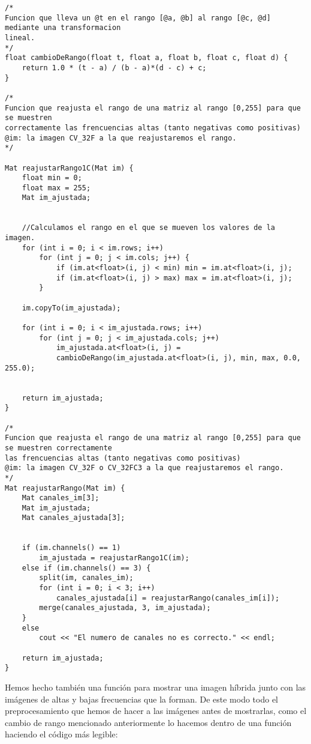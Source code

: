 \documentclass[10pt,a4paper]{article}
\begin{document}
\begin{lstlisting}
/*
Funcion que lleva un @t en el rango [@a, @b] al rango [@c, @d] mediante una transformacion
lineal.
*/
float cambioDeRango(float t, float a, float b, float c, float d) {
	return 1.0 * (t - a) / (b - a)*(d - c) + c;	
}

/*
Funcion que reajusta el rango de una matriz al rango [0,255] para que se muestren
correctamente las frencuencias altas (tanto negativas como positivas)
@im: la imagen CV_32F a la que reajustaremos el rango.
*/

Mat reajustarRango1C(Mat im) {
	float min = 0;
	float max = 255;
	Mat im_ajustada;


	//Calculamos el rango en el que se mueven los valores de la imagen.
	for (int i = 0; i < im.rows; i++)
		for (int j = 0; j < im.cols; j++) {
			if (im.at<float>(i, j) < min) min = im.at<float>(i, j);
			if (im.at<float>(i, j) > max) max = im.at<float>(i, j);
		}

	im.copyTo(im_ajustada);

	for (int i = 0; i < im_ajustada.rows; i++)
		for (int j = 0; j < im_ajustada.cols; j++)
			im_ajustada.at<float>(i, j) =
			cambioDeRango(im_ajustada.at<float>(i, j), min, max, 0.0, 255.0);


	return im_ajustada;
}

/*
Funcion que reajusta el rango de una matriz al rango [0,255] para que se muestren correctamente
las frencuencias altas (tanto negativas como positivas)
@im: la imagen CV_32F o CV_32FC3 a la que reajustaremos el rango.
*/
Mat reajustarRango(Mat im) {
	Mat canales_im[3];
	Mat im_ajustada;
	Mat canales_ajustada[3];


	if (im.channels() == 1)
		im_ajustada = reajustarRango1C(im);
	else if (im.channels() == 3) {
		split(im, canales_im);
		for (int i = 0; i < 3; i++)
			canales_ajustada[i] = reajustarRango(canales_im[i]);
		merge(canales_ajustada, 3, im_ajustada);
	}
	else
		cout << "El numero de canales no es correcto." << endl;

	return im_ajustada;
}
\end{lstlisting}

Hemos hecho también una función para mostrar una imagen híbrida junto con las imágenes de altas y bajas frecuencias que la forman. De este modo todo el preprocesamiento que hemos de hacer a las imágenes antes de mostrarlas, como el cambio de rango mencionado anteriormente lo hacemos dentro de una función haciendo el código más legible:\\
\end{document}
